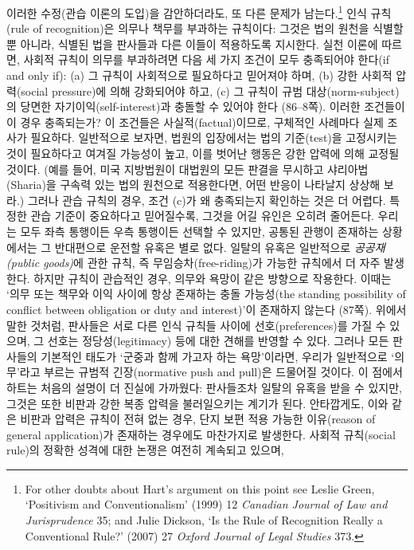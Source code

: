 \documentclass[12pt, oneside]{book}  %
\begin{document}
이러한 수정(관습 이론의 도입)을 감안하더라도, 또 다른 문제가
남는다.\footnote{For other doubts about Hart's argument on this point
  see Leslie Green, `Positivism and Conventionalism' (1999) 12
  \emph{Canadian Journal of Law and Jurisprudence} 35; and Julie
  Dickson, `Is the Rule of Recognition Really a Conventional Rule?'
  (2007) 27 \emph{Oxford Journal of Legal Studies} 373.} 인식 규칙(rule
of recognition)은 의무나 책무를 부과하는 규칙이다: 그것은 법의 원천을
식별할 뿐 아니라, 식별된 법을 판사들과 다른 이들이 적용하도록 지시한다.
실천 이론에 따르면, 사회적 규칙이 의무를 부과하려면 다음 세 가지 조건이
모두 충족되어야 한다(if and only if): (a) 그 규칙이 사회적으로 필요하다고 믿어져야 하며,
(b) 강한 사회적 압력(social pressure)에 의해 강화되어야 하고, (c) 그
규칙이 규범 대상(norm-subject)의 당면한 자기이익(self-interest)과 충돌할
수 있어야 한다 (86--8쪽). 이러한 조건들이 이 경우 충족되는가? 이
조건들은 사실적(factual)이므로, 구체적인 사례마다 실제 조사가 필요하다.
일반적으로 보자면, 법원의 입장에서는 법의 기준(test)을 고정시키는 것이
필요하다고 여겨질 가능성이 높고, 이를 벗어난 행동은 강한 압력에 의해
교정될 것이다. (예를 들어, 미국 지방법원이 대법원의 모든 판결을 무시하고
샤리아법(Sharia)을 구속력 있는 법의 원천으로 적용한다면, 어떤 반응이
나타날지 상상해 보라.) 그러나 관습 규칙의 경우, 조건 (c)가 왜 충족되는지
확인하는 것은 더 어렵다. 특정한 관습 기준이 중요하다고 믿어질수록,
그것을 어길 유인은 오히려 줄어든다. 우리는 모두 좌측 통행이든 우측
통행이든 선택할 수 있지만, 공통된 관행이 존재하는 상황에서는 그
반대편으로 운전할 유혹은 별로 없다. 일탈의 유혹은 일반적으로
\emph{공공재(public goods)}에 관한 규칙, 즉 무임승차(free-riding)가
가능한 규칙에서 더 자주 발생한다. 하지만 규칙이 관습적인 경우, 의무와
욕망이 같은 방향으로 작용한다. 이때는 `의무 또는 책무와 이익 사이에 항상
존재하는 충돌 가능성(the standing possibility of conflict between
obligation or duty and interest)'이 존재하지 않는다 (87쪽). 위에서 말한
것처럼, 판사들은 서로 다른 인식 규칙들 사이에 선호(preferences)를 가질
수 있으며, 그 선호는 정당성(legitimacy) 등에 대한 견해를 반영할 수 있다.
그러나 모든 판사들의 기본적인 태도가 `군중과 함께 가고자 하는
욕망'이라면, 우리가 일반적으로 `의무'라고 부르는 규범적 긴장(normative
push and pull)은 드물어질 것이다. 이 점에서 하트는 처음의 설명이 더
진실에 가까웠다: 판사들조차 일탈의 유혹을 받을 수 있지만, 그것은 또한
비판과 강한 복종 압력을 불러일으키는 계기가 된다. 안타깝게도, 이와 같은
비판과 압력은 규칙이 전혀 없는 경우, 단지 보편 적용 가능한 이유(reason
of general application)가 존재하는 경우에도 마찬가지로 발생한다. 사회적
규칙(social rule)의 정확한 성격에 대한 논쟁은 여전히 계속되고 있으며,
\end{document}
